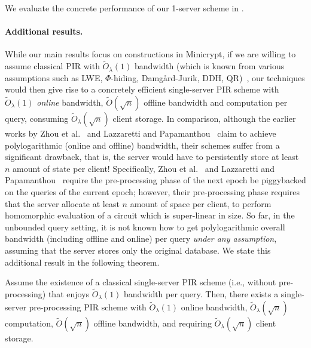 We evaluate the concrete performance 
of our 1-server scheme in .






\paragraph{Additional results.}
While our main results focus on constructions in Minicrypt, 
if we are willing to assume classical PIR with $\widetilde{O}_\lambda(1)$ 
bandwidth
(which is known from various assumptions such as 
LWE, $\Phi$-hiding, Damg\r{a}rd-Jurik, DDH, QR)~\cite{pir05,simplepir,spiral,tdh}, 
our techniques would 
then give rise to a concretely efficient
single-server PIR scheme %
with 
$\widetilde{O}_\lambda(1)$
{\it online} bandwidth, 
$\widetilde{O}(\sqrt{n})$
offline bandwidth and computation per query, 
consuming $\widetilde{O}_\lambda(\sqrt{n})$
client storage. 
In comparison, although the earlier works
by Zhou et al.~\cite{pir-ec23} and  
 Lazzaretti and Papamanthou~\cite{lazza-pir}
claim to achieve polylogarithmic (online and offline) bandwidth, 
their schemes suffer from a significant drawback, that is, 
the server would have to persistently
store at least $n$ amount of state per client! 
Specifically, Zhou et al.~\cite{pir-ec23} and
 Lazzaretti and Papamanthou~\cite{lazza-pir}
require the pre-processing
phase of the next epoch be piggybacked on 
the queries of the current epoch; however, 
their pre-processing phase requires 
that the server allocate at least $n$ amount of space  
per client, to perform homomorphic evaluation 
of a circuit which is super-linear in size. 
So far, in the unbounded query setting, 
it is not known how to get polylogarithmic overall bandwidth 
(including offline and online)
per query 
{\it under any assumption}, 
assuming that the server stores only the original database.
We state this additional result in the following theorem. 

\begin{theorem}
Assume %
the existence of a 
classical single-server PIR scheme (i.e., without pre-processing) 
that enjoys $\widetilde{O}_\lambda(1)$ bandwidth per query.
Then, there exists a single-server pre-processing PIR
scheme with 
$\widetilde{O}_\lambda(1)$ online bandwidth, 
$\widetilde{O}_\lambda(\sqrt{n})$ 
computation, 
$\widetilde{O}(\sqrt{n})$ 
offline bandwidth, 
and requiring 
$\widetilde{O}_\lambda(\sqrt{n})$ 
client storage. 
\label{thm:intro-pkc}
\end{theorem}

